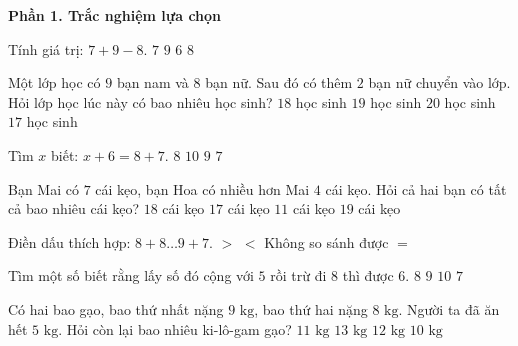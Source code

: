 \textbf{Phần 1. Trắc nghiệm lựa chọn}

\begin{ex} %
Tính giá trị: $7 + 9 - 8$.
\choice
{$7$}
{$9$}
{$6$}
{\True $8$}
\end{ex}

\begin{ex} %
Một lớp học có $9$ bạn nam và $8$ bạn nữ. Sau đó có thêm $2$ bạn nữ chuyển vào lớp. Hỏi lớp học lúc này có bao nhiêu học sinh?
\choice
{$18$ học sinh}
{\True $19$ học sinh}
{$20$ học sinh}
{$17$ học sinh}
\end{ex}

\begin{ex} %
Tìm $x$ biết: $x + 6 = 8 + 7$.
\choice
{$8$}
{$10$}
{\True $9$}
{$7$}
\end{ex}

\begin{ex} %
Bạn Mai có $7$ cái kẹo, bạn Hoa có nhiều hơn Mai $4$ cái kẹo. Hỏi cả hai bạn có tất cả bao nhiêu cái kẹo?
\choice
{\True $18$ cái kẹo}
{$17$ cái kẹo}
{$11$ cái kẹo}
{$19$ cái kẹo}
\end{ex}

\begin{ex} %
Điền dấu thích hợp: $8 + 8 \dots 9 + 7$.
\choice
{$>$}
{$<$}
{Không so sánh được}
{\True $=$}
\end{ex}

\begin{ex} %
Tìm một số biết rằng lấy số đó cộng với $5$ rồi trừ đi $8$ thì được $6$.
\choice
{$8$}
{\True $9$}
{$10$}
{$7$}
\end{ex}

\begin{ex} %
Có hai bao gạo, bao thứ nhất nặng $9\text{ kg}$, bao thứ hai nặng $8\text{ kg}$. Người ta đã ăn hết $5\text{ kg}$. Hỏi còn lại bao nhiêu ki-lô-gam gạo?
\choice
{$11\text{ kg}$}
{$13\text{ kg}$}
{\True $12\text{ kg}$}
{$10\text{ kg}$}
\end{ex}

